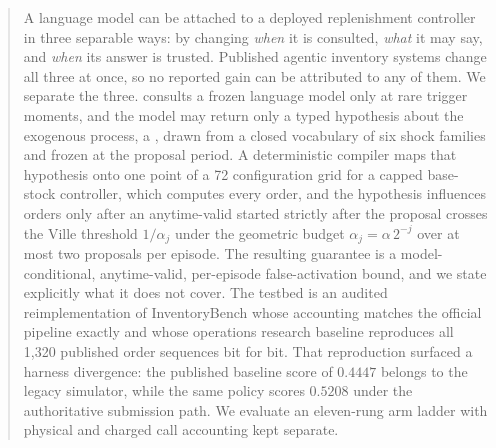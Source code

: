 \begin{abstract}
A language model can be attached to a deployed replenishment controller in three
separable ways: by changing \emph{when} it is consulted, \emph{what} it may say,
and \emph{when} its answer is trusted. Published agentic inventory systems change
all three at once, so no reported gain can be attributed to any of them. We
separate the three. \collie{} consults a frozen language model only at rare
trigger moments, and the model may return only a typed hypothesis about the
exogenous process, a \shockspec{}, drawn from a closed vocabulary of six shock
families and frozen at the proposal period. A deterministic compiler maps that
hypothesis onto one point of a 72 configuration grid for a capped base-stock
controller, which computes every order, and the hypothesis influences orders only
after an anytime-valid \eprocess{} started strictly after the proposal crosses
the Ville threshold $1/\alpha_j$ under the geometric budget
$\alpha_j = \alpha\,2^{-j}$ over at most two proposals per episode. The resulting
guarantee is a model-conditional, anytime-valid, per-episode false-activation
bound, and we state explicitly what it does not cover. The testbed is an audited
reimplementation of InventoryBench whose accounting matches the official pipeline
exactly and whose operations research baseline reproduces all 1{,}320 published
order sequences bit for bit. That reproduction surfaced a harness divergence: the
published baseline score of $0.4447$ belongs to the legacy simulator, while the
same policy scores $0.5208$ under the authoritative submission path. We evaluate
an eleven-rung arm ladder with physical and charged call accounting kept
separate. 
\end{abstract}
